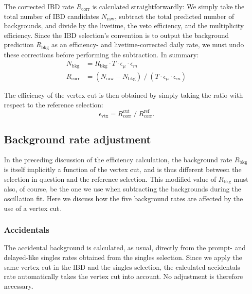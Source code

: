\documentclass[../thesis.tex]{subfiles}
\begin{document}
The corrected IBD rate $R_{\mathrm{corr}}$ is calculated straightforwardly: We simply take the total number of IBD candidates $N_{\mathrm{raw}}$, subtract the total predicted number of backgrounds, and divide by the livetime, the veto efficiency, and the multiplicity efficiency.
Since the IBD selection's convention is to output the background prediction $R_{\mathrm{bkg}}$ as an efficiency- and livetime-corrected daily rate, we must undo these corrections before performing the subtraction. In summary:
\begin{equation}
  \begin{aligned}
  N_{\mathrm{bkg}} &= R_{\mathrm{bkg}} \cdot T \cdot \epsilon_\mu \cdot \epsilon_m\\
  R_{\mathrm{corr}} &= (N_{\mathrm{raw}} - N_{\mathrm{bkg}}) \;/\; (T \cdot \epsilon_\mu \cdot \epsilon_m)
\end{aligned}
\end{equation}

The efficiency of the vertex cut is then obtained by simply taking the ratio with respect to the reference selection:
\begin{equation}
  \epsilon_{\mathrm{vtx}} = R_{\mathrm{corr}}^{\mathrm{cut}} \;/\; R_{\mathrm{corr}}^{\mathrm{ref}}.
\end{equation}

\subsection{Background rate adjustment}
\label{sec:cutVaryVtxCutBkgRate}

In the preceding discussion of the efficiency calculation, the background rate $R_{\mathrm{bkg}}$ is itself implicitly a function of the vertex cut, and is thus different between the selection in question and the reference selection. This modified value of $R_{\mathrm{bkg}}$ must also, of course, be the one we use when subtracting the backgrounds during the oscillation fit. Here we discuss how the five background rates are affected by the use of a vertex cut.

\subsubsection{Accidentals}

The accidental background is calculated, as usual, directly from the prompt- and delayed-like singles rates obtained from the singles selection. Since we apply the same vertex cut in the IBD and the singles selection, the calculated accidentals rate automatically takes the vertex cut into account. No adjustment is therefore necessary.
\end{document}
